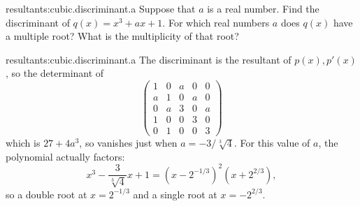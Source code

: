 \begin{problem}{resultants:cubic.discriminant.a}
Suppose that \(a\) is a real number.
Find the discriminant of \(q(x)=x^3+ax+1\).
For which real numbers \(a\) does \(q(x)\) have a multiple root?
What is the multiplicity of that root?
\end{problem}
\begin{answer}{resultants:cubic.discriminant.a}
The discriminant is the resultant of \(p(x),p'(x)\), so the determinant of
\[
\begin{pmatrix}
1&0&a&0&0\\
a&1&0&a&0\\
0&a&3&0&a\\
1&0&0&3&0\\
0&1&0&0&3
\end{pmatrix}
\]
which is \(27+4a^3\), so vanishes just when \(a=-3/\sqrt[3]{4}\).
For this value of \(a\), the polynomial actually factors:
\[
x^3-\frac{3}{\sqrt[3]{4}}x+1
=
(x-2^{-1/3})^2(x+2^{2/3}),
\]
so a double root at \(x=2^{-1/3}\) and a single root at \(x=-2^{2/3}\).
\end{answer}

